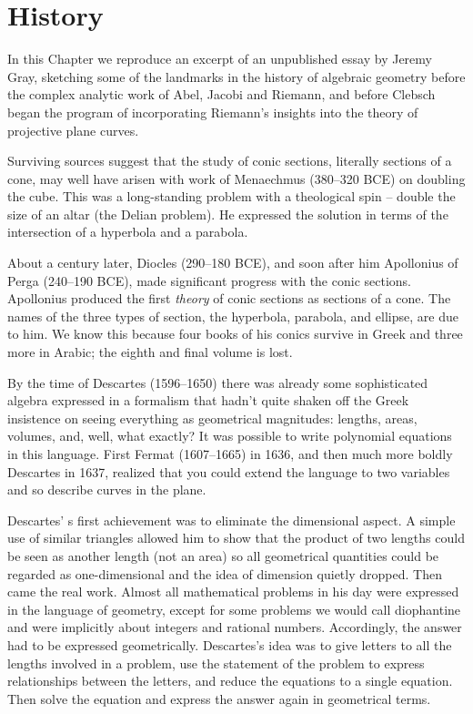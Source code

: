 

\chapter{History} 
\label{History}

In this Chapter we reproduce an excerpt of an unpublished essay by Jeremy Gray, sketching some of the landmarks in the history of algebraic geometry before the complex analytic work of
Abel, Jacobi and Riemann, and before Clebsch began the program of incorporating Riemann's insights into the theory of projective plane curves.

Surviving sources suggest that the study of conic sections, literally sections of a cone, may well have arisen with work of Menaechmus (380--320 BCE) on doubling the cube. This was a long-standing problem with a theological spin -- double the size of an altar (the Delian problem).  He expressed the solution in terms of the intersection
of a hyperbola and a parabola. 

About a century later, Diocles (290--180 BCE), and soon after him Apollonius of Perga (240--190 BCE), made significant progress with the conic sections.
Apollonius produced the first \emph{theory} of conic sections as sections of a cone. The names of the three types of section, the hyperbola, parabola, and ellipse,  are due to him.
We know this because four books of his conics survive in Greek and three more in Arabic; the eighth and final volume is lost. 

By the time of Descartes (1596--1650) there was already some sophisticated algebra expressed in a formalism that hadn't quite shaken off the Greek insistence on seeing everything as geometrical magnitudes: lengths, areas, volumes, and, well, what exactly? It was possible to write polynomial equations in this language. First Fermat (1607--1665) in 1636, and then much more boldly Descartes in 1637, realized that you could extend the language to two variables and so describe curves in the plane.

Descartes' s first achievement was to eliminate the dimensional aspect. A simple use of similar triangles allowed him to show that the product of two lengths could be seen as another length (not an area) so all geometrical quantities could be regarded as one-dimensional and the idea of dimension quietly dropped. Then came the real work. Almost all mathematical problems in his day were expressed in the language of geometry, except for some problems we would call diophantine and were implicitly about integers and rational numbers. Accordingly, the answer had to be expressed geometrically. Descartes's idea was to give letters to all the lengths involved in a problem, use the statement of the problem to express relationships between the letters, and reduce the equations to a single equation. Then solve the equation and express the answer again in geometrical terms.  

